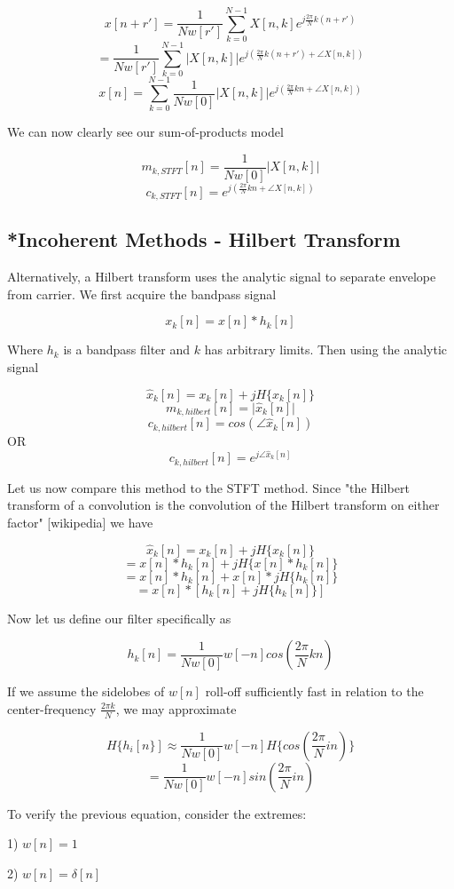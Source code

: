 \documentclass [11pt, proquest] {uwthesis}[2015/03/03]
\begin{document}
$$x[n + r'] = \frac{1}{Nw[r']}  \sum\limits_{k=0}^{N-1} X[n,k] e^{j\frac{2\pi}{N}k(n+r')}$$
$$= \frac{1}{Nw[r']}  \sum\limits_{k=0}^{N-1} \vert X[n,k]\vert e^{j(\frac{2\pi}{N}k(n+r') + \angle X[n,k])}$$
$$x[n] =\sum\limits_{k=0}^{N-1}  \frac{1}{Nw[0]}  \vert X[n,k]\vert e^{j(\frac{2\pi}{N}kn + \angle X[n,k])}$$

We can now clearly see our sum-of-products model

$$m_{k,STFT}[n] =  \frac{1}{Nw[0]}  \vert X[n,k]\vert$$
$$c_{k,STFT}[n] = e^{j(\frac{2\pi}{N}kn + \angle X[n,k])}$$

\subsection{*Incoherent Methods - Hilbert Transform}

Alternatively, a Hilbert transform uses the analytic signal to separate envelope from carrier.  We first acquire the bandpass signal

$$x_k[n] = x[n] * h_k[n]$$

Where $h_k$ is a bandpass filter and $k$ has arbitrary limits.  Then using the analytic signal

$$\widehat{x}_k[n] = x_k[n] + jH\{x_k[n]\}$$
$$m_{k,hilbert}[n] = \vert\widehat{x}_k[n]\vert$$
$$c_{k,hilbert}[n] = cos(\angle\widehat{x}_k[n])$$
OR
$$c_{k,hilbert}[n] = e^{j\angle\widehat{x}_k[n]}$$

Let us now compare this method to the STFT method.  Since "the Hilbert transform of a convolution is the convolution of the Hilbert transform on either factor" [wikipedia] we have 

$$\widehat{x}_k[n] = x_k[n] + jH\{x_k[n]\}$$
$$= x[n] * h_k[n] + jH\{x[n] * h_k[n]\}$$
$$= x[n] * h_k[n] + x[n] * jH\{h_k[n]\}$$
$$= x[n] * [h_k[n]+  jH\{h_k[n]\}]$$

Now let us define our filter specifically as

$$h_k[n] = \frac{1}{Nw[0]}w[-n]cos(\frac{2\pi}{N}kn)$$

If we assume the sidelobes of $w[n]$ roll-off sufficiently fast in relation to the center-frequency $\frac{2\pi k}{N}$, we may approximate

$$H\{h_i[n\}] \approx \frac{1}{Nw[0]}w[-n] H\{cos(\frac{2\pi}{N}in)\}$$
$$= \frac{1}{Nw[0]}w[-n]sin(\frac{2\pi}{N}in)$$

To verify the previous equation, consider the extremes:

1) $w[n] = 1$

2) $w[n] = \delta[n]$
\end{document}
